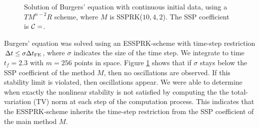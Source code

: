 \begin{figure}[t!]
    \centering
    \caption{Solution of Burgers' equation with continuous initial data, using a 
    $TM^{n-2}R$ scheme, where $ M $ is SSPRK($10,4,2$). 
    The SSP coefficient is $\mathcal{C} =$.}
    \label{fig:burgers_cont}
\end{figure}

Burgers' equation was solved using an ESSPRK-scheme with time-step 
restriction $\Delta t \leq \sigma{\Delta t}_{\text{FE}}$, where $\sigma$ indicates the size 
of the time step. 
We integrate to time $t_{f} = 2.3$
with $m = 256$ points in space.
Figure \ref{fig:burgers_cont} shows that if $\sigma$ stays below the SSP 
coefficient of the method $M$, then no oscillations are observed. 
If this stability limit is violated, then oscillations appear. 
We were able to determine when exactly the nonlinear stability is not 
satisfied by computing the the total-variation (TV) norm at each step of the 
computation process. 
This indicates that the ESSPRK-scheme inherits the time-step restriction 
from the SSP coefficient of the main method $M$.


